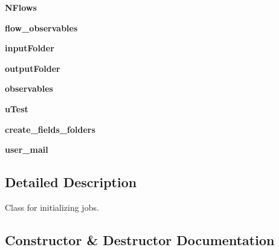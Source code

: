 \begin{DoxyCompactItemize}
{\bfseries N\+Flows}
\item 
\mbox{\label{classcreate_jobs_1_1_job_creator_a3a9e2e0937884bbd269bb72001e01d9a}} 
{\bfseries flow\+\_\+observables}
\item 
\mbox{\label{classcreate_jobs_1_1_job_creator_a3915eec33c6fd45f96c5662bbfe1df31}} 
{\bfseries input\+Folder}
\item 
\mbox{\label{classcreate_jobs_1_1_job_creator_a6fd30a157d6e0f170141b05cc6261bb3}} 
{\bfseries output\+Folder}
\item 
\mbox{\label{classcreate_jobs_1_1_job_creator_a021cfc44a9e47ebbf602e318a4bec8f9}} 
{\bfseries observables}
\item 
\mbox{\label{classcreate_jobs_1_1_job_creator_ab1db5dd928ee475670eabb9d69041370}} 
{\bfseries u\+Test}
\item 
\mbox{\label{classcreate_jobs_1_1_job_creator_ac2407c2690bfc3966c19e4c99d2cce75}} 
{\bfseries create\+\_\+fields\+\_\+folders}
\item 
\mbox{\label{classcreate_jobs_1_1_job_creator_adc5b676b9d35f0ac84bfb23249f293f9}} 
{\bfseries user\+\_\+mail}
\end{DoxyCompactItemize}


\subsection{Detailed Description}
\begin{DoxyVerb}Class for initializing jobs.\end{DoxyVerb}
 

\subsection{Constructor \& Destructor Documentation}
\mbox{\label{classcreate_jobs_1_1_job_creator_aa4dd9a3ec7e043c0664a1472f668ddd5}} 
